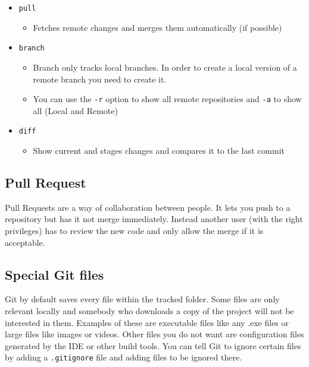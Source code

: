 \documentclass{article}
\begin{document}
\begin{itemize}
\begin{itemize}
		\end{itemize}
		\item{\texttt{pull}}
		\begin{itemize}
			\item{Fetches remote changes and merges them automatically (if possible)}
		\end{itemize}
		\item{\texttt{branch}}
		\begin{itemize}
			\item{Branch only tracks local branches. In order to create a local version of a remote branch you need to create it.}
			\item{You can use the \texttt{-r} option to show all remote repositories and \texttt{-a} to show all (Local and Remote)}
		\end{itemize}
		\item{\texttt{diff}}
		\begin{itemize}
			\item{Show current and stages changes and compares it to the last commit}
		\end{itemize}
	\end{itemize}
	\subsection{Pull Request}
	Pull Requests are a way of collaboration between people. It lets you push to a repository but has it not merge immediately. Instead another user (with the right privileges) has to review the new code and only allow the merge if it is acceptable.
	\subsection{Special Git files}
	Git by default saves every file within the tracked folder. Some files are only relevant locally and somebody who downloads a copy of the project will not be interested in them. Examples of these are executable files like any .exe files or large files like images or videos. Other files you do not want are configuration files generated by the IDE or other build tools. You can tell Git to ignore certain files by adding a \texttt{.gitignore} file and adding files to be ignored there.
\end{document}
